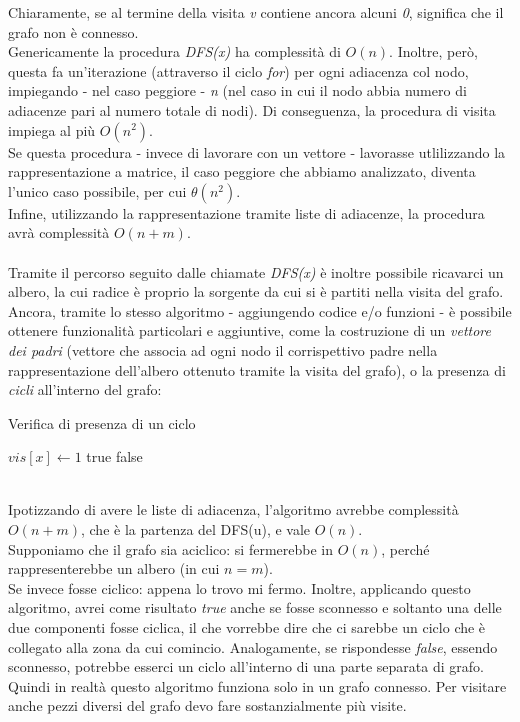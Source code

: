 Chiaramente, se al termine della visita \textit{v} contiene ancora alcuni \textit{0}, significa che il grafo non è connesso. \\
Genericamente la procedura \textit{DFS(x)} ha complessità di $O(n)$. Inoltre, però, questa fa un'iterazione (attraverso il ciclo \textit{for}) per ogni adiacenza col nodo, impiegando - nel caso peggiore - \textit{n} (nel caso in cui il nodo abbia numero di adiacenze pari al numero totale di nodi). Di conseguenza, la procedura di visita impiega al più $O(n^2)$. \\
Se questa procedura - invece di lavorare con un vettore - lavorasse utlilizzando la rappresentazione a matrice, il caso peggiore che abbiamo analizzato, diventa l'unico caso possibile, per cui $\theta(n^2)$. \\
Infine, utilizzando la rappresentazione tramite liste di adiacenze, la procedura avrà complessità $O(n+m)$. \\\\
Tramite il percorso seguito dalle chiamate \textit{DFS(x)} è inoltre possibile ricavarci un albero, la cui radice è proprio la sorgente da cui si è partiti nella visita del grafo. \\
Ancora, tramite lo stesso algoritmo - aggiungendo codice e/o funzioni - è possibile ottenere funzionalità particolari e aggiuntive, come la costruzione di un \textit{vettore dei padri} (vettore che associa ad ogni nodo il corrispettivo padre nella rappresentazione dell'albero ottenuto tramite la visita del grafo), o la presenza di \textit{cicli} all'interno del grafo:
\begin{algorithm}
    \caption{Verifica di presenza di un ciclo}\label{alg:VPC}
    \begin{algorithmic}[1]
         
            \State $vis[x] \gets 1$ 
             
	                \Return true
                \EndIf
            \EndFor
            \State \Return false
        \EndFunction
    \end{algorithmic}
\end{algorithm} \hfill \\

Ipotizzando di avere le liste di adiacenza, l'algoritmo avrebbe complessità $O(n+m)$, che è la partenza del DFS(u), e vale $O(n)$. \\
Supponiamo che il grafo sia aciclico: si fermerebbe in $O(n)$, perché rappresenterebbe un albero (in cui $n = m$). \\
Se invece fosse ciclico: appena lo trovo mi fermo. Inoltre, applicando questo algoritmo, avrei come risultato \textit{true} anche se fosse sconnesso e soltanto una delle due componenti fosse ciclica, il che vorrebbe dire che ci sarebbe un ciclo che è collegato alla zona da cui comincio. Analogamente, se rispondesse \textit{false}, essendo sconnesso, potrebbe esserci un ciclo all'interno di una parte separata di grafo. Quindi in realtà questo algoritmo funziona solo in un grafo connesso. Per visitare anche pezzi diversi del grafo devo fare sostanzialmente più visite. \\


